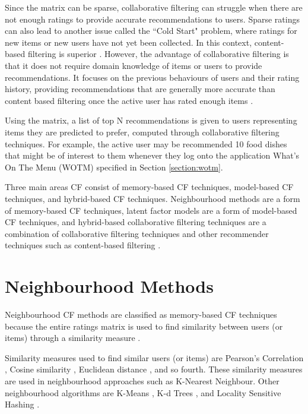 Since the matrix can be sparse, collaborative filtering can struggle when there are not enough ratings to provide accurate recommendations to users. Sparse ratings can also lead to another issue called the ``Cold Start" problem, where ratings for new items or new users have not yet been collected. In this context, content-based filtering is superior \cite{koren2009matrix}. However, the advantage of collaborative filtering is that it does not require domain knowledge of items or users to provide recommendations. It focuses on the previous behaviours of users and their rating history, providing recommendations that are generally more accurate than content based filtering once the active user has rated enough items \cite{koren2009matrix, schafer2007collaborative}. 

Using the matrix, a list of top N recommendations is given to users representing items they are predicted to prefer, computed through collaborative filtering techniques. For example, the active user may be recommended 10 food dishes that might be of interest to them whenever they log onto the application What's On The Menu (WOTM) specified in Section \ref{section:wotm}.  

Three main areas CF consist of memory-based CF techniques, model-based CF techniques, and hybrid-based CF techniques. Neighbourhood methods are a form of memory-based CF techniques, latent factor models are a form of model-based CF techniques, and hybrid-based collaborative filtering techniques are a combination of collaborative filtering techniques and other recommender techniques such as content-based filtering \cite{survey, koren2009matrix}.

\section{Neighbourhood Methods}

Neighbourhood CF methods are classified as memory-based CF techniques because the entire ratings matrix is used to find similarity between users (or items) through a similarity measure \cite{memorybased, schafer2007collaborative}. 

Similarity measures used to find similar users (or items) are Pearson's Correlation \cite{zeng2003similarity, itembased, mahoutaction}, Cosine similarity \cite{itembased}, Euclidean distance \cite{similarity, mahoutaction}, and so fourth. These similarity measures are used in neighbourhood approaches such as K-Nearest Neighbour. Other neighbourhood algorithms are K-Means \cite{survey}, K-d Trees \cite{survey}, and Locality Sensitive Hashing \cite{survey}. 

